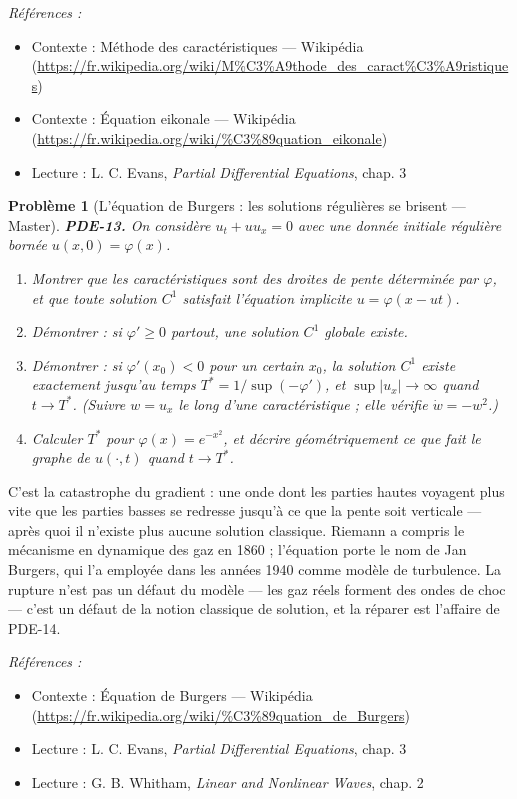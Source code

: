 \documentclass[11pt]{article}
\newtheorem{problem}{Problème}
\newenvironment{refs}{\par\small\noindent\emph{Références :}\begin{itemize}\setlength\itemsep{0pt}}{\end{itemize}\normalsize}
\begin{document}
\begin{refs}
\item Contexte : Méthode des caractéristiques --- Wikipédia (\url{https://fr.wikipedia.org/wiki/M%C3%A9thode_des_caract%C3%A9ristiques})
\item Contexte : Équation eikonale --- Wikipédia (\url{https://fr.wikipedia.org/wiki/%C3%89quation_eikonale})
\item Lecture : L. C. Evans, \textit{Partial Differential Equations}, chap. 3
\end{refs}

\bigskip

\begin{problem}[{L'équation de Burgers : les solutions régulières se brisent --- Master}]
\textbf{PDE-13.} On considère $u_t + u u_x = 0$ avec une donnée
initiale régulière bornée $u(x,0) = \varphi(x)$.
\begin{enumerate}
\item[(a)] Montrer que les caractéristiques sont des
droites de pente déterminée par $\varphi$, et que toute solution $C^1$
satisfait l'équation implicite $u = \varphi(x - ut)$.
\item[(b)] Démontrer : si
$\varphi' \ge 0$ partout, une solution $C^1$ globale existe.
\item[(c)] Démontrer : si
$\varphi'(x_0) < 0$ pour un certain $x_0$, la solution $C^1$ existe exactement jusqu'au
temps $T^* = 1/\sup(-\varphi')$, et $\sup|u_x| \to \infty$ quand $t \to T^*$.
(Suivre $w = u_x$ le long d'une caractéristique ; elle vérifie $\dot{w} = -w^2$.)
\item[(d)] Calculer $T^*$ pour $\varphi(x) = e^{-x^2}$, et décrire géométriquement ce que
fait le graphe de $u(\cdot,t)$ quand $t \to T^*$.
\end{enumerate}

\end{problem}

\noindent C'est la catastrophe du gradient : une onde dont les parties hautes voyagent
plus vite que les parties basses se redresse jusqu'à ce que la pente soit verticale --- après quoi
il n'existe plus aucune solution classique. Riemann a compris le mécanisme en dynamique des gaz
en 1860 ; l'équation porte le nom de Jan Burgers, qui l'a employée dans les années 1940 comme
modèle de turbulence. La rupture n'est pas un défaut du modèle --- les gaz réels forment des ondes
de choc --- c'est un défaut de la notion classique de solution, et la réparer est l'affaire de
PDE-14.

\begin{refs}
\item Contexte : Équation de Burgers --- Wikipédia (\url{https://fr.wikipedia.org/wiki/%C3%89quation_de_Burgers})
\item Lecture : L. C. Evans, \textit{Partial Differential Equations}, chap. 3
\item Lecture : G. B. Whitham, \textit{Linear and Nonlinear Waves}, chap. 2
\end{refs}
\end{document}
